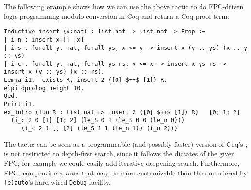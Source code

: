 The following
example shows how we can use the above tactic to do FPC-driven logic
programming modulo conversion in Coq and return a Coq proof-term:
\begin{lstlisting}[]
Inductive insert (x:nat) : list nat -> list nat -> Prop :=
| i_n : insert x [] [x]
| i_s : forall y: nat, forall ys, x <= y -> insert x (y :: ys) (x :: y :: ys)
| i_c : forall y: nat, forall ys rs, y <= x -> insert x ys rs -> insert x (y :: ys) (x :: rs).
Lemma i1:  exists R, insert 2 ([0] $++$ [1]) R.
elpi dprolog height 10.
Qed.
Print i1.
ex_intro (fun R : list nat => insert 2 ([0] $++$ [1]) R)   [0; 1; 2]
  (i_c 2 0 [1] [1; 2] (le_S 0 1 (le_S 0 0 (le_n 0)))
	 (i_c 2 1 [] [2] (le_S 1 1 (le_n 1)) (i_n 2)))
\end{lstlisting}

The  tactic can be seen as a programmable (and possibly
faster) version of Coq's %
; %
  is not restricted to depth-first search, since
it follows the dictates of the given FPC; for example we could easily add
iterative-deepening search. Furthermore,
 FPCs can provide a
\emph{trace} that may be more customizable than the one offered by 
\texttt{(e)auto}'s hard-wired \texttt{Debug} facility. 


